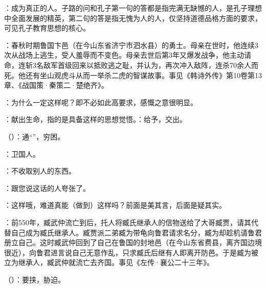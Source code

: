 {
\item {}：成为真正的人。子路的问和孔子第一句的答都是指完满无缺憾的人，是孔子理想中全面发展的精英，第二句的答是指无愧为人的人，仅坚持道德品格方面的要求，可见孔子教育思想的核心。
\item {}：春秋时期鲁国卞邑（在今山东省济宁市泗水县）的勇士。母亲在世时，他连续3次从战场上逃生，受人羞辱而不变色。母亲去世后第3年又爆发战争，他主动请命，连斩3名敌军首级回来以抵败逃之耻，并认为，再次冲入敌阵，连杀70余人而死。他还有坐山观虎斗从而一举杀二虎的智谋故事。事见《韩诗外传》第10卷第13章、《战国策·秦策二·楚绝齐》。
\item {}：为什么一定这样呢？即不必如此高要求，感慨之意很明显。

\item {}：献出生命，指的是具备这样的思想觉悟。：给予，交出。
\item {}（）：通“”，穷困。
}
{}


{
\item {}：卫国人。
\item {}：不收取别人的东西。
\item {}：跟您说这话的人夸张了。
\item {}：这样哦，难道真能（做到）这样吗？前面是美其言，后面是疑其实。
}
{}


{
\item {}：前550年，臧武仲流亡到后，托人将臧氏继承人的信物送给了大哥臧贾，请其代替自己成为臧氏继承人。臧贾派二弟臧为带龟向鲁君请求名分，臧为却趁机请鲁君册立自己。这时臧武仲回到了自己在鲁国的封地邑（在今山东省费县，离齐国边境很近），向鲁君进言说自己无意作乱，只求臧氏后继有人即离开防邑。于是臧为被立为继承人，臧武仲就流亡去齐国。事见《左传·襄公二十三年》。
\item {}（）：要挟，胁迫。
}
{}


